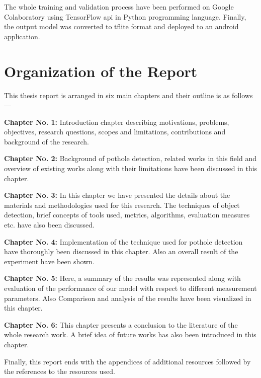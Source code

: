     The whole training and validation process have been performed on Google Colaboratory using TensorFlow \acrshort{api} in Python programming language. Finally, the output model was converted to \gls{tflite} format and deployed to an android application.
    
\section{Organization of the Report}
    This thesis report is arranged in six main chapters and their outline is as follows---
    
    \vspace{3mm}\textbf{Chapter No. 1:} Introduction chapter describing motivations, problems, objectives, research questions, scopes and limitations, contributions and background of the research.
    
    \vspace{3mm}\textbf{Chapter No. 2:} Background of pothole detection, related works in this field and overview of existing works along with their limitations have been discussed in this chapter.
    
    \vspace{3mm}\textbf{Chapter No. 3:} In this chapter we have presented the details about the materials and methodologies used for this research. The techniques of object detection, brief concepts of tools used, metrics, algorithms, evaluation measures etc. have also been discussed.
    
    \vspace{3mm}\textbf{Chapter No. 4:} Implementation of the technique used for pothole detection have thoroughly been discussed in this chapter. Also an overall result of the experiment have been shown.
    
    \vspace{3mm}\textbf{Chapter No. 5:} Here, a summary of the results was represented along with evaluation of the performance of our model with respect to different measurement parameters. Also Comparison and analysis of the results have been visualized in this chapter.
    
    \vspace{3mm}\textbf{Chapter No. 6:} This chapter presents a conclusion to the literature of the whole research work. A brief idea of future works has also been introduced in this chapter.
    
    \vspace{15mm} Finally, this report ends with the appendices of additional resources followed by the references to the resources used.
